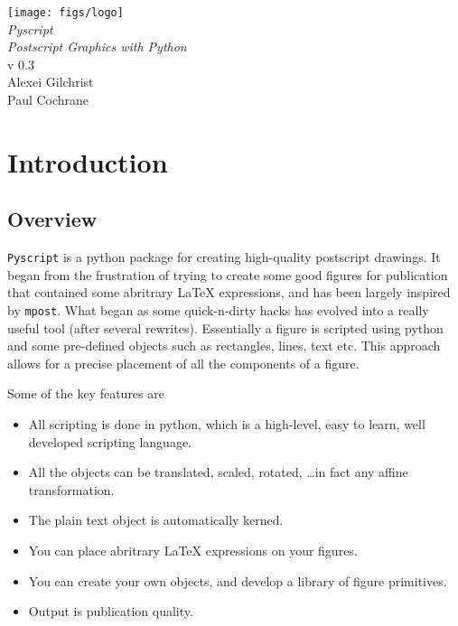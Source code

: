 \documentclass[a4paper]{book}
\begin{document}
\begin{titlepage}
\begin{center}
\vspace*{3cm}
\LARGE

\texttt{[image: figs/logo]}\\[4cm]

{\Huge \emph{Pyscript}}\\[1cm]
\emph{Postscript Graphics with Python}\\[2cm]

v 0.3\\[2cm]

Alexei Gilchrist\\
Paul Cochrane
\end{center}
\end{titlepage}

\frontmatter

\tableofcontents

\mainmatter

\chapter{Introduction}
\label{cha:introduction}


\section{Overview}

\Verb|Pyscript| is a python package for creating high-quality postscript
drawings.  It began from the frustration of trying to create some good figures
for publication that contained some abritrary \LaTeX{} expressions, and has
been largely inspired by \Verb|mpost|. What began as some quick-n-dirty hacks
has evolved into a really useful tool (after several rewrites). Essentially a
figure is scripted using python and some pre-defined objects such as
rectangles, lines, text etc. This approach allows for a precise placement of
all the components of a figure.

Some of the key features are
\begin{itemize}
\item All scripting is done in python, which is a high-level, easy to
  learn, well developed scripting language.
\item All the objects can be translated, scaled, rotated, \ldots in fact any
affine transformation.  
\item The plain text object is automatically kerned.
\item You can place abritrary \LaTeX{} expressions on your figures.
\item You can create your own objects, and develop a library of figure 
primitives. 
\item Output is publication quality.
\end{itemize}
\end{document}
